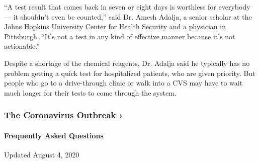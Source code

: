 ``A test result that comes back in seven or eight days is worthless for
everybody --- it shouldn't even be counted,'' said Dr. Amesh Adalja, a
senior scholar at the Johns Hopkins University Center for Health
Security and a physician in Pittsburgh. ``It's not a test in any kind of
effective manner because it's not actionable.''

Despite a shortage of the chemical reagents, Dr. Adalja said he
typically has no problem getting a quick test for hospitalized patients,
who are given priority. But people who go to a drive-through clinic or
walk into a CVS may have to wait much longer for their tests to come
through the system.

\href{https://www.nytimes.com/news-event/coronavirus?action=click\&pgtype=Article\&state=default\&region=MAIN_CONTENT_3\&context=storylines_faq}{}

\hypertarget{the-coronavirus-outbreak-}{%
\subsubsection{The Coronavirus Outbreak
›}\label{the-coronavirus-outbreak-}}

\hypertarget{frequently-asked-questions}{%
\paragraph{Frequently Asked
Questions}\label{frequently-asked-questions}}

Updated August 4, 2020


